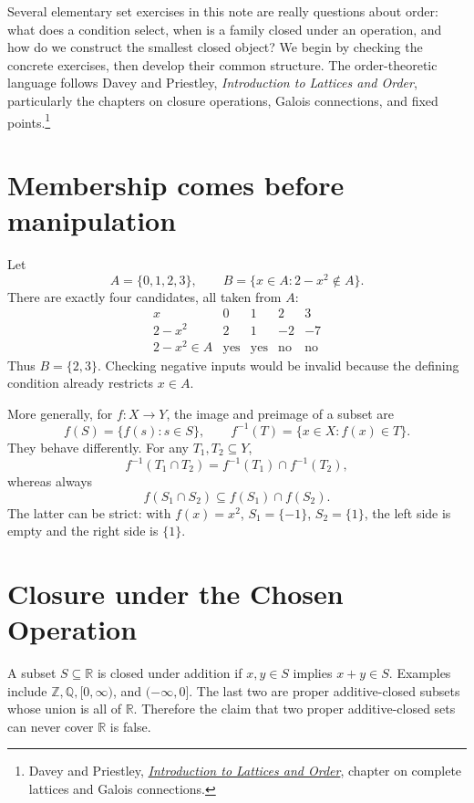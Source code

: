 
Several elementary set exercises in this note are really questions about order: what does a condition select, when is a family closed under an operation, and how do we construct the smallest closed object? We begin by checking the concrete exercises, then develop their common structure. The order-theoretic language follows Davey and Priestley, \emph{Introduction to Lattices and Order}, particularly the chapters on closure operations, Galois connections, and fixed points.\footnote{Davey and Priestley, \href{https://www.cambridge.org/core/books/abs/introduction-to-lattices-and-order/complete-lattices-and-galois-connections/545B86CEB2DE644B2C3E484E68805B8B}{\emph{Introduction to Lattices and Order}}, chapter on complete lattices and Galois connections.}

\section{Membership comes before manipulation}

Let
\[
 A=\{0,1,2,3\},\qquad B=\{x\in A:2-x^2\notin A\}.
\]
There are exactly four candidates, all taken from \(A\):
\[
\begin{array}{c|rrrr}
x&0&1&2&3\\ \hline
2-x^2&2&1&-2&-7\\
2-x^2\in A&\text{yes}&\text{yes}&\text{no}&\text{no}
\end{array}
\]
Thus \(B=\{2,3\}\). Checking negative inputs would be invalid because the defining condition already restricts \(x\in A\).

More generally, for \(f:X\to Y\), the image and preimage of a subset are
\[
 f(S)=\{f(s):s\in S\},\qquad
 f^{-1}(T)=\{x\in X:f(x)\in T\}.
\]
They behave differently. For any \(T_1,T_2\subseteq Y\),
\[
 f^{-1}(T_1\cap T_2)=f^{-1}(T_1)\cap f^{-1}(T_2),
\]
whereas always
\[
 f(S_1\cap S_2)\subseteq f(S_1)\cap f(S_2).
\]
The latter can be strict: with \(f(x)=x^2\), \(S_1=\{-1\}\), \(S_2=\{1\}\), the left side is empty and the right side is \(\{1\}\).

\section{Closure under the Chosen Operation}

A subset \(S\subseteq\mathbb R\) is closed under addition if \(x,y\in S\) implies \(x+y\in S\). Examples include \(\mathbb Z,\mathbb Q,[0,\infty)\), and \((-\infty,0]\). The last two are proper additive-closed subsets whose union is all of \(\mathbb R\). Therefore the claim that two proper additive-closed sets can never cover \(\mathbb R\) is false.

